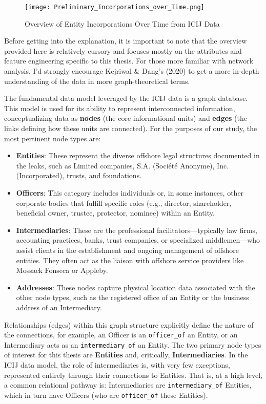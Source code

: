 \begin{figure}[htbp]
    \centering
    \texttt{[image: Preliminary\_Incorporations\_over\_Time.png]}
    \caption{Overview of Entity Incorporations Over Time from ICIJ Data}
    \label{fig:incorporations_time}
\end{figure}
Before getting into the explanation, it is important to note that the overview provided here is relatively cursory and focuses mostly on the attributes and feature engineering specific to this thesis. For those more familiar with network analysis, I'd strongly encourage Kejriwal \& Dang's (2020) to get a more in-depth understanding of the data in more graph-theoretical terms.

The fundamental data model leveraged by the ICIJ data is a graph database. This model is used for its ability to represent interconnected information, conceptualizing data as \textbf{nodes} (the core informational units) and \textbf{edges} (the links defining how these units are connected). For the purposes of our study, the most pertinent node types are:
\begin{itemize}
    \item \textbf{Entities}: These represent the diverse offshore legal structures documented in the leaks, such as Limited companies, S.A. (Société Anonyme), Inc. (Incorporated), trusts, and foundations.
    \item \textbf{Officers}: This category includes individuals or, in some instances, other corporate bodies that fulfill specific roles (e.g., director, shareholder, beneficial owner, trustee, protector, nominee) within an Entity.
    \item \textbf{Intermediaries}: These are the professional facilitators—typically law firms, accounting practices, banks, trust companies, or specialized middlemen—who assist clients in the establishment and ongoing management of offshore entities. They often act as the liaison with offshore service providers like Mossack Fonseca or Appleby.
    \item \textbf{Addresses}: These nodes capture physical location data associated with the other node types, such as the registered office of an Entity or the business address of an Intermediary.
\end{itemize}

Relationships (edges) within this graph structure explicitly define the nature of the connections, for example, an Officer is an \texttt{officer\_of} an Entity, or an Intermediary acts as an \texttt{intermediary\_of} an Entity. The two primary node types of interest for this thesis are \textbf{Entities} and, critically, \textbf{Intermediaries}. In the ICIJ data model, the role of intermediaries is, with very few exceptions, represented entirely through their connections to Entities. That is, at a high level, a common relational pathway is: Intermediaries are \texttt{intermediary\_of} Entities, which in turn have Officers (who are \texttt{officer\_of} these Entities).

